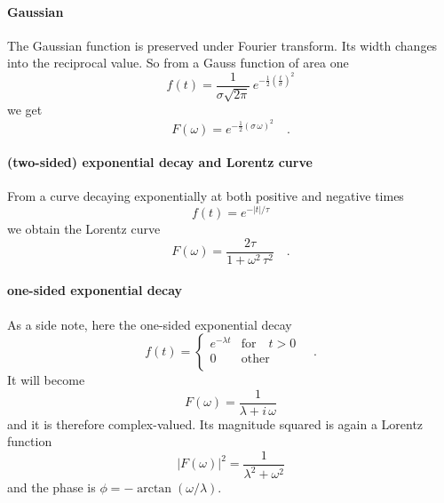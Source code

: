 \paragraph{Gaussian} The Gaussian function is preserved under Fourier transform. Its width changes into the reciprocal value. So from a Gauss function of area one
\begin{equation}
 f(t) = \frac{1}{\sigma \sqrt{2 \pi}} \, e^{- \frac{1}{2} \left( \frac{t}{\sigma} \right)^2}
\end{equation}
we get
\begin{equation}
 F(\omega) = e^{- \frac{1}{2} \left( \sigma \, \omega \right) ^2 } \quad .
\end{equation}



\paragraph{(two-sided) exponential decay and Lorentz curve} From a curve decaying exponentially at both positive and negative times
\begin{equation}
 f(t) = e^{- |t| / \tau}
\end{equation}
we obtain the Lorentz curve
\begin{equation}
 F(\omega) = \frac{2 \tau}{1 + \omega^2 \, \tau^2} \quad .
\end{equation}


\paragraph{one-sided exponential decay} As a side note, here  the one-sided exponential decay
\begin{equation}
 f(t) = \left\{ \begin{array}{ll}
e^{- \lambda t } & \text{for} \quad t > 0 \\
 0 & \text{other} \\
 \end{array}
 \right. \quad .
\end{equation}
It will become
\begin{equation}
 F(\omega) = \frac{1}{\lambda + i \, \omega}
\end{equation}
and it is therefore complex-valued. Its magnitude squared is again a Lorentz function
\begin{equation}
| F(\omega)|^2 = \frac{1}{\lambda^2 + \omega^2}
\end{equation}
and the phase is $\phi = - \arctan(\omega / \lambda)$.


